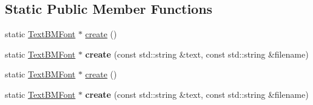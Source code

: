 \subsection*{Static Public Member Functions}
\begin{DoxyCompactItemize}
\item 
static \hyperlink{classui_1_1TextBMFont}{Text\+B\+M\+Font} $\ast$ \hyperlink{classui_1_1TextBMFont_ade2ac8339648fb906dbee35d8437f7da}{create} ()
\item 
\mbox{\label{classui_1_1TextBMFont_a6c623112db7bc832bc508f1a009928f5}} 
static \hyperlink{classui_1_1TextBMFont}{Text\+B\+M\+Font} $\ast$ {\bfseries create} (const std\+::string \&text, const std\+::string \&filename)
\item 
static \hyperlink{classui_1_1TextBMFont}{Text\+B\+M\+Font} $\ast$ \hyperlink{classui_1_1TextBMFont_a8adc055a065b8fe1a81571ed357bc6d1}{create} ()
\item 
\mbox{\label{classui_1_1TextBMFont_a95861326a1debc98d353f6545159cc73}} 
static \hyperlink{classui_1_1TextBMFont}{Text\+B\+M\+Font} $\ast$ {\bfseries create} (const std\+::string \&text, const std\+::string \&filename)
\end{DoxyCompactItemize}
